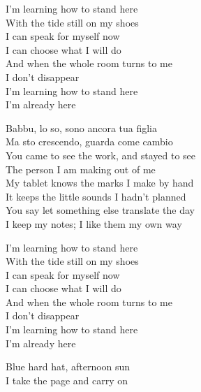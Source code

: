 \begin{lyrics}
I’m learning how to stand here\\
With the tide still on my shoes\\
I can speak for myself now\\
I can choose what I will do\\
And when the whole room turns to me\\
I don’t disappear\\
I’m learning how to stand here\\
I’m already here

Babbu, lo so, sono ancora tua figlia\\
Ma sto crescendo, guarda come cambio\\
You came to see the work, and stayed to see\\
The person I am making out of me\\
My tablet knows the marks I make by hand\\
It keeps the little sounds I hadn’t planned\\
You say let something else translate the day\\
I keep my notes; I like them my own way

I’m learning how to stand here\\
With the tide still on my shoes\\
I can speak for myself now\\
I can choose what I will do\\
And when the whole room turns to me\\
I don’t disappear\\
I’m learning how to stand here\\
I’m already here

Blue hard hat, afternoon sun\\
I take the page and carry on
\end{lyrics}


